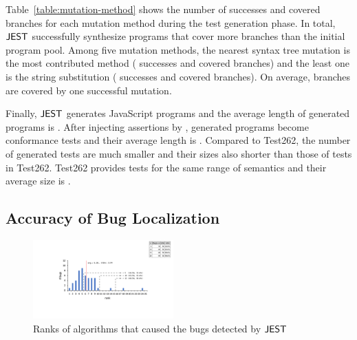 Table~\ref{table:mutation-method} shows the number of successes and covered
branches for each mutation method during the test generation phase.  In total,
$\tool$ successfully synthesize  programs that cover 
more branches than the initial program pool.  Among five mutation methods, the
nearest syntax tree mutation is the most contributed method (
successes and  covered branches) and the least one is the string
substitution ( successes and  covered branches).  On average,
 branches are covered by one successful mutation.

Finally, $\tool$ generates  JavaScript programs and the average
length of generated programs is .  After injecting assertions by
, generated programs become conformance tests and
their average length is .  Compared to Test262, the number of
generated tests are much smaller and their sizes also shorter than those of tests
in Test262.  Test262 provides  tests for the same range of
semantics and their average size is .


\subsection{Accuracy of Bug Localization}

\begin{figure}[t]
  \centering
  \includegraphics[width=0.48\textwidth]{img/localize.pdf}
  \caption{Ranks of algorithms that caused the bugs detected by $\tool$}
  \label{fig:localize}
  \vspace*{-1em}
\end{figure}

